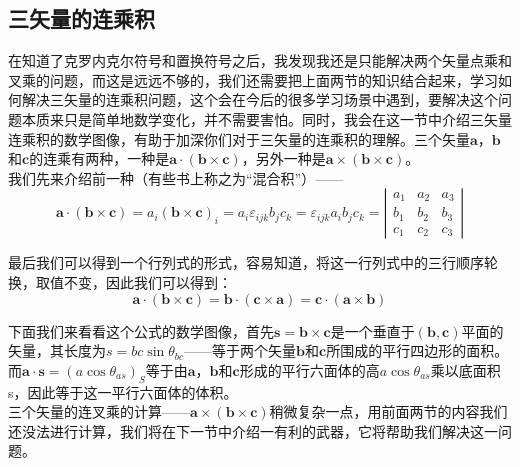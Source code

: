\documentclass{ctexart}
\begin{document}
\subsection{三矢量的连乘积}
    在知道了克罗内克尔符号和置换符号之后，我发现我还是只能解决两个矢量点乘和叉乘的问题，而这是远远不够的，我们还需要把上面两节的知识结合起来，学习如何解决三矢量的连乘积问题，这个会在今后的很多学习场景中遇到，要解决这个问题本质来只是简单地数学变化，并不需要害怕。同时，我会在这一节中介绍三矢量连乘积的数学图像，有助于加深你们对于三矢量的连乘积的理解。三个矢量$ \boldsymbol{a}$，$ \boldsymbol{b}$和$\boldsymbol{c}$的连乘有两种，一种是$\boldsymbol{a} \cdot( \boldsymbol{b} \times \boldsymbol{c})$，另外一种是$\boldsymbol{a} \times (\boldsymbol{b} \times \boldsymbol{c})$。\\
    我们先来介绍前一种（有些书上称之为“混合积”）——
    $$
    \boldsymbol{a} \cdot (\boldsymbol{b} \times \boldsymbol{c})=a_{i}(\boldsymbol{b} \times \boldsymbol{c})_{i}=a_{i} \varepsilon_{i j k} b_{j} c_{k}=\varepsilon_{i j k} a_{i} b_{j} c_{k}=\left|\begin{array}{lll}
    a_{1} & a_{2} & a_{3} \\
    b_{1} & b_{2} & b_{3} \\
    c_{1} & c_{2} & c_{3}
    \end{array}\right|
    $$
    \par
    最后我们可以得到一个行列式的形式，容易知道，将这一行列式中的三行顺序轮换，取值不变，因此我们可以得到：
    $$
    \boldsymbol{a} \cdot (\boldsymbol{b} \times \boldsymbol{c})=\boldsymbol{b} \cdot (\boldsymbol{c} \times \boldsymbol{a})=\boldsymbol{c} \cdot (\boldsymbol{a} \times \boldsymbol{b})
    $$
    \par
    下面我们来看看这个公式的数学图像，首先$\boldsymbol{s}=\boldsymbol{b} \times \boldsymbol{c}$是一个垂直于$(\boldsymbol{b},\boldsymbol{c})$平面的矢量，其长度为$s=bc \sin\theta_{bc}$——等于两个矢量$\boldsymbol{b}$和$\boldsymbol{c}$所围成的平行四边形的面积。而$\boldsymbol{a} \cdot \boldsymbol{s}=(a \cos\theta_{as})_{S}$等于由$ \boldsymbol{a}$，$ \boldsymbol{b}$和$\boldsymbol{c}$形成的平行六面体的高$a \cos\theta_{as}$乘以底面积s，因此等于这一平行六面体的体积。\\
    三个矢量的连叉乘的计算——$\boldsymbol{a} \times (\boldsymbol{b} \times \boldsymbol{c})$稍微复杂一点，用前面两节的内容我们还没法进行计算，我们将在下一节中介绍一有利的武器，它将帮助我们解决这一问题。
\end{document}
